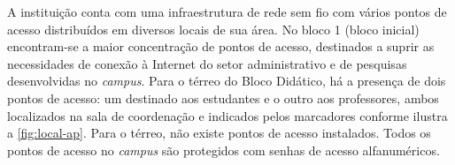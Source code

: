 \begin{figure}[H]
	\centering
\end{figure}


A instituição conta com uma infraestrutura de rede sem fio com vários pontos de acesso distribuídos em diversos locais de sua área. No bloco 1 (bloco inicial) encontram-se a maior concentração de pontos de acesso, destinados a suprir as necessidades de conexão à Internet do setor administrativo e de pesquisas desenvolvidas no \textit{campus}. Para o térreo do Bloco Didático, há a presença de dois pontos de acesso: um destinado aos estudantes e o outro aos professores, ambos localizados na sala de coordenação e indicados pelos marcadores conforme ilustra a \autoref{fig:local-ap}. Para o térreo, não existe pontos de acesso instalados. Todos os pontos de acesso no \textit{campus} são protegidos com senhas de acesso alfanuméricos.

\begin{figure}[H]
	\centering
\end{figure}


